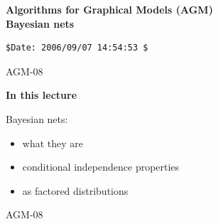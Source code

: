 \documentclass[landscape]{slides}
\newcommand{\lecnum}{AGM-08}
\newcommand{\slidehead}[1]{{\centering \bf #1 \\}}
\newenvironment{titledslide}[1]{\begin{slide}\slidehead{#1}\vfill}{\vfill \tiny \lecnum \end{slide}}
\begin{document}
\begin{titledslide}{Algorithms for Graphical Models (AGM)\\
\vfill {\Huge Bayesian nets}}\vfill

\begin{verbatim}
$Date: 2006/09/07 14:54:53 $
\end{verbatim}

\end{titledslide}
\begin{titledslide}{In this lecture}

  Bayesian nets:
    \begin{itemize}
    \item what they are
    \item conditional independence properties
    \item as factored distributions
    \end{itemize}



\end{titledslide}  
\end{document}
